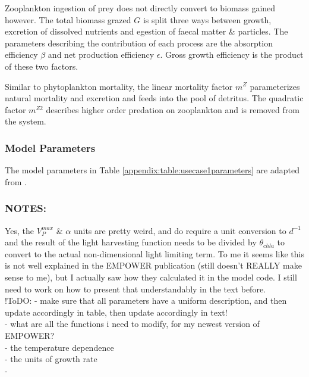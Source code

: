 \documentclass[template.tex]{subfiles}
\begin{document}
Zooplankton ingestion of prey does not directly convert to biomass gained however. The total biomass grazed $G$ is split three ways between growth, excretion of dissolved nutrients and egestion of faecal matter \& particles. The parameters describing the contribution of each process are the absorption efficiency $\beta$ and net production efficiency $\epsilon$. Gross growth efficiency is the product of these two factors.  

Similar to phytoplankton mortality, the linear mortality factor $m^Z$ parameterizes natural mortality and excretion and feeds into the pool of detritus. The quadratic factor $m^{Z2}$ describes higher order predation on zooplankton and is removed from the system.



\subsubsection{Model Parameters}
The model parameters in Table \ref{appendix:table:usecase1parameters} are adapted from \citet{Anderson2015c}.


\subsubsection{NOTES:}
Yes, the $V^{max}_P$ \& $\alpha$  units are pretty weird, and do require a unit conversion to $d^{-1}$ and the result of the light harvesting function needs to be divided by $\theta_{chla}$ to convert to the actual non-dimensional light limiting term. To me it seems like this is not well explained in the EMPOWER publication (still doesn't REALLY make sense to me), but I actually saw how they calculated it in the model code. I still need to work on how to present that understandably in the text before. 
\\ !ToDO: 
- make sure that all parameters have a uniform description, and then update accordingly in table, then update accordingly in text! \\

- what are all the functions i need to modify, for my newest version of EMPOWER? \\
    - the temperature dependence \\
    - the units of growth rate \\
    - \\


\clearpage
\end{document}
